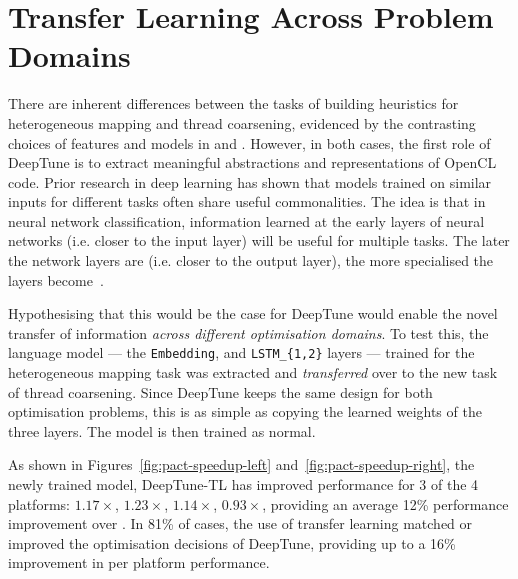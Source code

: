 \section{Transfer Learning Across Problem Domains}
\label{sec:deeptune-transfer-learning}

There are inherent differences between the tasks of building heuristics for heterogeneous mapping and thread coarsening, evidenced by the contrasting choices of features and models in \citeauthor{Grewe2013} and \citeauthor{Magni2014}. However, in both cases, the first role of DeepTune is to extract meaningful abstractions and representations of OpenCL code. Prior research in deep learning has shown that models trained on similar inputs for different tasks often share useful commonalities. The idea is that in neural network classification, information learned at the early layers of neural networks (i.e. closer to the input layer) will be useful for multiple tasks. The later the network layers are (i.e. closer to the output layer), the more specialised the layers become~\cite{Zeiler2014}.

Hypothesising that this would be the case for DeepTune would enable the novel transfer of information \emph{across different optimisation domains}. To test this, the language model --- the \texttt{Embedding}, and \texttt{LSTM\_\{1,2\}} layers --- trained for the heterogeneous mapping task was extracted and \emph{transferred} over to the new task of thread coarsening. Since DeepTune keeps the same design for both optimisation problems, this is as simple as copying the learned weights of the three layers. The model is then trained as normal.

As shown in Figures~\ref{fig:pact-speedup-left} and~\ref{fig:pact-speedup-right}, the newly trained model, DeepTune-TL has improved performance for 3 of the 4 platforms: $1.17\times$, $1.23\times$, $1.14\times$, $0.93\times$, providing an average 12\% performance improvement over \citeauthor{Magni2014}. In 81\% of cases, the use of transfer learning matched or improved the optimisation decisions of DeepTune, providing up to a 16\% improvement in per platform performance.

